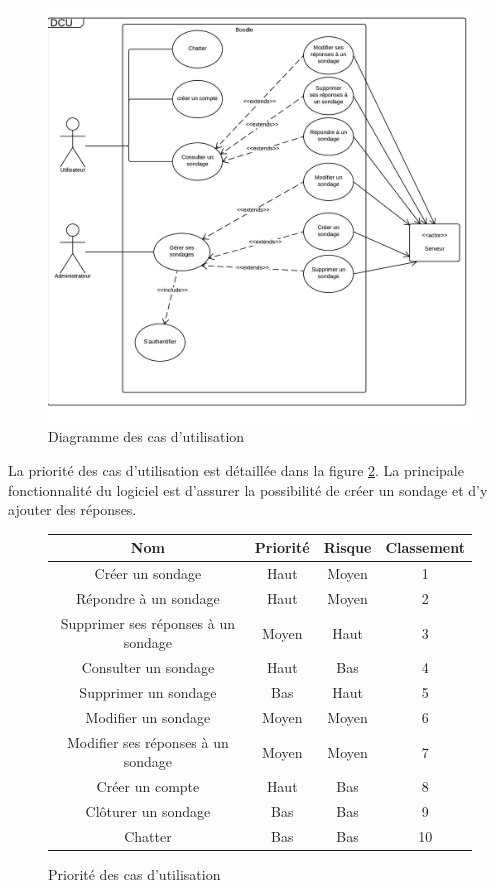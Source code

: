 \documentclass[titlepage]{report}
\begin{document}
\begin{figure}[h]
	\caption{Diagramme des cas d'utilisation}
	\label{diagramme_casDUtilisation}
	\centering
	\includegraphics[scale=0.8]{figures/diagrammes/casDUtilisation.png}
\end{figure}

\par La priorité des cas d'utilisation est détaillée dans la figure \ref{tableau_casDUtilisation}. La principale fonctionnalité du logiciel est d'assurer la possibilité de créer un sondage et d'y ajouter des réponses.

	\begin{figure}[h]
	\caption{Priorité des cas d'utilisation}
	\label{tableau_casDUtilisation}
	\centering
\begin{tabular}{|c|c|c|c|}
	\hline
	Nom & Priorité & Risque & Classement \\
	\hline
	Créer un sondage & Haut & Moyen & 1 \\
	Répondre à un sondage & Haut & Moyen & 2 \\
	Supprimer ses réponses à un sondage & Moyen & Haut & 3 \\
	Consulter un sondage & Haut & Bas & 4 \\
	Supprimer un sondage & Bas & Haut & 5 \\
	Modifier un sondage & Moyen & Moyen & 6 \\
	Modifier ses réponses à un sondage & Moyen & Moyen & 7 \\
	Créer un compte & Haut & Bas & 8 \\
	Clôturer un sondage & Bas & Bas & 9 \\
	Chatter & Bas & Bas & 10 \\
	\hline
\end{tabular}
\end{figure}
\end{document}
